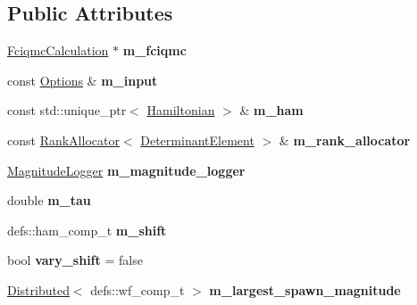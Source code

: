 \subsection*{Public Attributes}
\begin{DoxyCompactItemize}
\item 
\hyperlink{classFciqmcCalculation}{Fciqmc\+Calculation} $\ast$ {\bfseries m\+\_\+fciqmc}\hypertarget{classPropagator_a4e8f77154491c0ba05aea63c7eaa7782}{}\label{classPropagator_a4e8f77154491c0ba05aea63c7eaa7782}

\item 
const \hyperlink{structOptions}{Options} \& {\bfseries m\+\_\+input}\hypertarget{classPropagator_af3d5e986c9a3e8ba8e7cbd99a72ba06e}{}\label{classPropagator_af3d5e986c9a3e8ba8e7cbd99a72ba06e}

\item 
const std\+::unique\+\_\+ptr$<$ \hyperlink{classHamiltonian}{Hamiltonian} $>$ \& {\bfseries m\+\_\+ham}\hypertarget{classPropagator_a833303c5ec4014fc38307efe9f4459d8}{}\label{classPropagator_a833303c5ec4014fc38307efe9f4459d8}

\item 
const \hyperlink{classRankAllocator}{Rank\+Allocator}$<$ \hyperlink{classDeterminantElement}{Determinant\+Element} $>$ \& {\bfseries m\+\_\+rank\+\_\+allocator}\hypertarget{classPropagator_ae414f3d7cac59531bf137cc21516150a}{}\label{classPropagator_ae414f3d7cac59531bf137cc21516150a}

\item 
\hyperlink{classMagnitudeLogger}{Magnitude\+Logger} {\bfseries m\+\_\+magnitude\+\_\+logger}\hypertarget{classPropagator_a5131b9c4e15c10470af5c3893409e17c}{}\label{classPropagator_a5131b9c4e15c10470af5c3893409e17c}

\item 
double {\bfseries m\+\_\+tau}\hypertarget{classPropagator_af39851af12a48a31dc3359e7ba79c59f}{}\label{classPropagator_af39851af12a48a31dc3359e7ba79c59f}

\item 
defs\+::ham\+\_\+comp\+\_\+t {\bfseries m\+\_\+shift}\hypertarget{classPropagator_aebcf610f2d5b46f7632c6fd598700449}{}\label{classPropagator_aebcf610f2d5b46f7632c6fd598700449}

\item 
bool {\bfseries vary\+\_\+shift} = false\hypertarget{classPropagator_a0ed4dce86ccd8630b96d9b1d6daae9ec}{}\label{classPropagator_a0ed4dce86ccd8630b96d9b1d6daae9ec}

\item 
\hyperlink{classDistributed}{Distributed}$<$ defs\+::wf\+\_\+comp\+\_\+t $>$ {\bfseries m\+\_\+largest\+\_\+spawn\+\_\+magnitude}\hypertarget{classPropagator_a5c0106298a20ccbcb79da68ffd2b6166}{}\label{classPropagator_a5c0106298a20ccbcb79da68ffd2b6166}

\end{DoxyCompactItemize}


